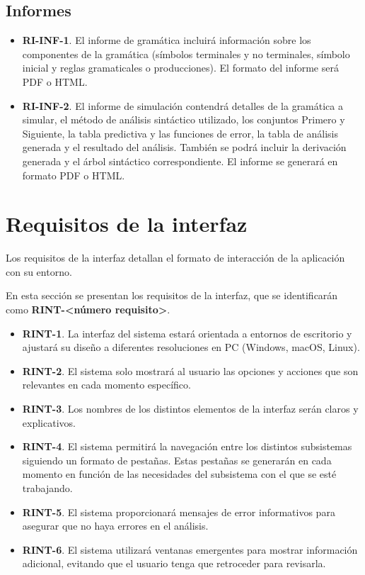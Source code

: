 \subsection{Informes}

\begin{itemize}
    \item \textbf{RI-INF-1}. El informe de gramática incluirá información sobre los componentes de la gramática (símbolos terminales y no terminales, símbolo inicial y reglas gramaticales o producciones). El formato del informe será PDF o HTML.
    \item  \textbf{RI-INF-2}. El informe de simulación contendrá detalles de la gramática a simular, el método de análisis sintáctico utilizado, los conjuntos Primero y Siguiente, la tabla predictiva y las funciones de error, la tabla de análisis generada y el resultado del análisis. También se podrá incluir la derivación generada y el árbol sintáctico correspondiente. El informe se generará en formato PDF o HTML.
\end{itemize}



\section{Requisitos de la interfaz}\label{sec:requisitos_interfaz}

Los requisitos de la interfaz detallan el formato de interacción de la aplicación con su entorno.

En esta sección se presentan los requisitos de la interfaz, que se identificarán como \textbf{RINT-<número requisito>}.

\begin{itemize}
    \item \textbf{RINT-1}. La interfaz del sistema estará orientada a entornos de escritorio y ajustará su diseño a diferentes resoluciones en PC (Windows, macOS, Linux).
    \item \textbf{RINT-2}. El sistema solo mostrará al usuario las opciones y acciones que son relevantes en cada momento específico.
    \item \textbf{RINT-3}. Los nombres de los distintos elementos de la interfaz serán claros y explicativos.
    \item \textbf{RINT-4}. El sistema permitirá la navegación entre los distintos subsistemas siguiendo un formato de pestañas. Estas pestañas se generarán en cada momento en función de las necesidades del subsistema con el que se esté trabajando.
    \item \textbf{RINT-5}. El sistema proporcionará mensajes de error informativos para asegurar que no haya errores en el análisis.
    \item \textbf{RINT-6}. El sistema utilizará ventanas emergentes para mostrar información adicional, evitando que el usuario tenga que retroceder para revisarla.
\end{itemize}